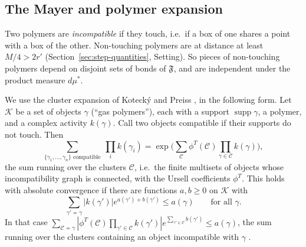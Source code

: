\subsection{The Mayer and polymer expansion}\label{subsec:cl-mayer}

Two polymers are \emph{incompatible} if they touch, i.e.\ if a box of one shares a point with a box of the other. Non-touching polymers are at distance at least $M/4>2r'$ (Section~\ref{sec:step-quantities}, Setting). So pieces of non-touching polymers depend on disjoint sets of bonds of $\mathfrak F$, and are independent under the product measure $d\mu^*$.

We use the cluster expansion of Koteck\'y and Preiss \cite{KP}, in the following form. Let $\mathcal K$ be a set of objects $\gamma$ (``gas polymers''), each with a support $\operatorname{supp}\gamma$, a polymer, and a complex activity $k(\gamma)$. Call two objects compatible if their supports do not touch. Then
\[
\sum_{\{\gamma_1,\dots,\gamma_n\}\text{ compatible}}\ \prod_ik(\gamma_i)=\exp\Big(\sum_{\mathcal C}\phi^T(\mathcal C)\prod_{\gamma\in\mathcal C}k(\gamma)\Big),
\]
the sum running over the clusters $\mathcal C$, i.e.\ the finite multisets of objects whose incompatibility graph is connected, with the Ursell coefficients $\phi^T$. This holds with absolute convergence if there are functions $a,b\ge0$ on $\mathcal K$ with
\begin{equation}\label{eq:KP}
\sum_{\gamma'\not\sim\gamma}|k(\gamma')|e^{a(\gamma')+b(\gamma')}\le a(\gamma)\qquad\text{for all }\gamma .
\end{equation}
In that case $\sum_{\mathcal C\not\sim\gamma}|\phi^T(\mathcal C)\prod_{\gamma'\in\mathcal C}k(\gamma')|e^{\sum_{\gamma'\in\mathcal C}b(\gamma')}\le a(\gamma)$, the sum running over the clusters containing an object incompatible with $\gamma$ \cite{KP}.

